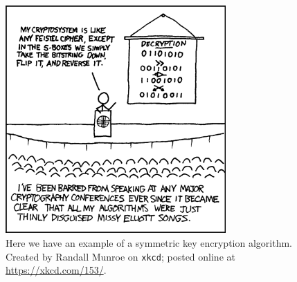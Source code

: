 \begin{figure}[t]
\centering
    \includegraphics[width=0.75\textwidth]{figures/xkcd/xkcd_153_cryptography.png}
    \caption[\texttt{xkcd} Cryptography]{Here we have an example of
        a \gls{symmetric key encryption} algorithm.
        Created by Randall Munroe on \texttt{xkcd};
        posted online at \url{https://xkcd.com/153/}.
        }
    \label{fig:xkcd_cryptography}
\end{figure}
